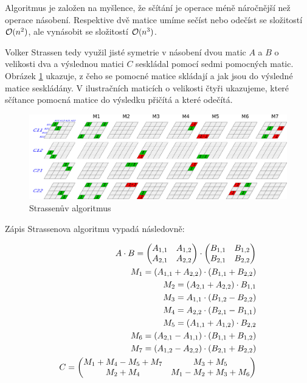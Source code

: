 Algoritmus je založen na myšlence, že sčítání je operace méně náročnější než operace násobení. Respektive dvě matice umíme sečíst nebo odečíst se složitostí $\mathcal{O}(n^2)$, ale vynásobit se složitostí $\mathcal{O}(n^3)$.

Volker Strassen tedy využil jisté symetrie \cite{StrNat} v násobení dvou matic $A$ a $B$ o velikosti dva a výslednou matici $C$ seskládal pomocí sedmi pomocných matic. Obrázek \ref{fig:StrVis} ukazuje, z čeho se pomocné matice skládají a jak jsou do výsledné matice seskládány. V ilustračních maticích o velikosti čtyři ukazujeme, které sčítance pomocná matice do výsledku přičítá a které odečítá. 

\begin{figure}[H]\centering
	\includegraphics[width=\textwidth]{./images/strassen}
	\caption{Strassenův algoritmus \cite{strassenimage}}
	\label{fig:StrVis}
\end{figure}

Zápis Strassenova algoritmu vypadá následovně:	

\begin{align}
A \cdot B = \begin{pmatrix}
 A_{1,1} & A_{1,2} \\
 A_{2,1} & A_{2,2} \\
\end{pmatrix} \cdot \begin{pmatrix}
 B_{1,1} & B_{1,2} \\
 B_{2,1} & B_{2,2} \\
\end{pmatrix} \notag\\
M_{1} = (A_{1,1} + A_{2,2}) \cdot (B_{1,1} + B_{2,2}) \notag\\
M_{2} = (A_{2,1} + A_{2,2}) \cdot B_{1,1} \notag\\
M_{3} = A_{1,1} \cdot (B_{1,2} - B_{2,2}) \notag\\
M_{4} = A_{2,2} \cdot (B_{2,1} - B_{1,1}) \notag\\
M_{5} = (A_{1,1} + A_{1,2}) \cdot B_{2,2} \notag\\
M_{6} = (A_{2,1} - A_{1,1}) \cdot (B_{1,1} + B_{1,2}) \notag\\
M_{7} = (A_{1,2} - A_{2,2}) \cdot (B_{2,1} + B_{2,2}) \notag\\
C = \begin{pmatrix}
 M_{1} + M_{4} - M_{5} + M_{7} & M_{3} + M_{5} \\
 M_{2} + M_{4} & M_{1} - M_{2} + M_{3} + M_{6}
\end{pmatrix}
\end{align}

